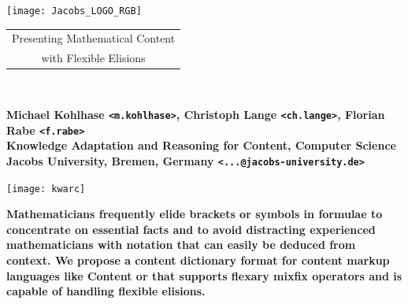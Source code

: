 \documentclass[a0,portrait]{a0poster}
\def\defaulttextfont{\Large}
\newenvironment{authorbox}[1]{\begin{minipage}[c]{#1}\centering\Large\bf}{\end{minipage}}
\newcommand{\yellowbox}[1]{%
    \renewcommand{\rmdefault}{lmr}%
    \setlength{\fboxrule}{0.1cm}%
    \setlength{\fboxsep}{.5cm}%
    {\begin{center}%
    \fcolorbox{black}{light-yellow}%
    {\parbox{0.9\textwidth}%
    {\vspace{0.5cm} \bf \Large #1
    \vspace{0.5cm}}}\end{center}}%
    \renewcommand{\rmdefault}{ptm}}
\begin{document}
\begin{center}
  \begin{minipage}[c]{0.19\textwidth}\centering\texttt{[image: Jacobs\_LOGO\_RGB]}\end{minipage}%
  \begin{minipage}[c]{0.62\textwidth} 
    \begin{center}
      {\veryHuge \bf
        \begin{tabular}[t]{c}
          Presenting Mathematical Content\\
          with Flexible Elisions
        \end{tabular}}\\
      \vspace{1cm}
      \begin{authorbox}{\textwidth}
        Michael Kohlhase \texttt{<m.kohlhase>}, Christoph Lange
        \texttt{<ch.lange>}, Florian Rabe \texttt{<f.rabe>}\\[.5cm]
      Knowledge Adaptation and Reasoning for Content, Computer Science\\
        Jacobs University, Bremen, Germany \texttt{<...@jacobs-university.de>}
      \end{authorbox}
    \end{center}
\end{minipage}%
  \begin{minipage}[c]{0.19\textwidth}\centering\texttt{[image: kwarc]}\end{minipage}%
\end{center}
\vspace{0.5cm} \yellowbox{Mathematicians frequently elide brackets or symbols in
  formulae to concentrate on essential facts and to avoid distracting
  experienced mathematicians with notation that can easily be deduced from
  context.  We propose a content dictionary format for content markup languages
  like Content {\mathml} or {\openmath} that supports flexary mixfix operators
  and is capable of handling flexible elisions.}  \vspace{0.5cm} \defaulttextfont
\end{document}
